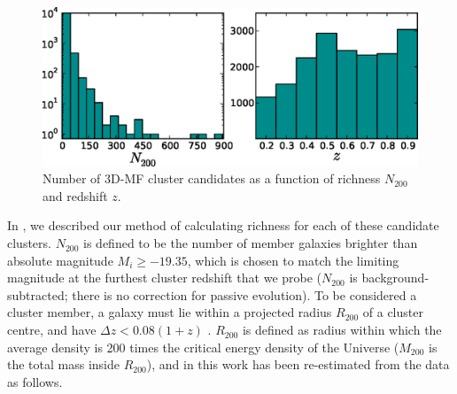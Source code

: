 \begin{figure}
\begin{center}
\vspace{0.5cm}
  \includegraphics[scale=0.9]{plots_ch4/hists_N200_z_NoGaps.eps}
  \caption[Richness and Redshift Distributions of \ac{3D-MF} Clusters]{Number of \ac{3D-MF} cluster candidates as a function of richness $N_{200}$ and redshift $z$.}
\label{plot:hists}
\end{center}
\end{figure}

In \citet{Ford14}, we described our method of calculating richness for each of these candidate clusters. $N_{200}$ is defined to be the number of member galaxies brighter than absolute magnitude $M_i \ge -19.35$, which is chosen to match the limiting magnitude at the furthest cluster redshift that we probe ($N_{200}$ is background-subtracted; there is no correction for passive evolution). To be considered a cluster member, a galaxy must lie within a projected radius $R_{200}$ of a cluster centre, and have $\Delta z < 0.08(1+z)$ \citep[based on the photometric errors of the \ac{CFHTLenS} catalogue; for details regarding $N_{200}$ see][]{Ford14}. $R_{200}$ is defined as radius within which the average density is 200 times the critical energy density of the Universe ($M_{200}$ is the total mass inside $R_{200}$), and in this work has been re-estimated from the data as follows. 

